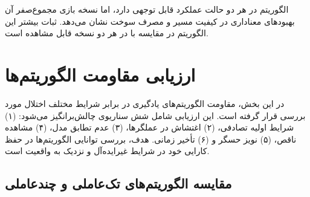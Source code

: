 الگوریتم  در هر دو حالت عملکرد قابل توجهی دارد، اما نسخه بازی مجموع‌صفر آن بهبودهای معناداری در کیفیت مسیر و مصرف سوخت نشان می‌دهد. ثبات بیشتر این الگوریتم در مقایسه با  در هر دو نسخه قابل مشاهده است.

\section{ارزیابی مقاومت الگوریتم‌ها}

در این بخش، مقاومت الگوریتم‌های یادگیری در برابر شرایط مختلف اختلال مورد بررسی قرار گرفته است. این ارزیابی شامل شش سناریوی چالش‌برانگیز می‌شود: (۱) شرایط اولیه تصادفی، (۲) اغتشاش در عملگرها، (۳) عدم تطابق مدل، (۴) مشاهده ناقص، (۵) نویز حسگر و (۶) تأخیر زمانی. هدف، بررسی توانایی الگوریتم‌ها در حفظ کارایی خود در شرایط غیرایده‌آل و نزدیک به واقعیت است.

\subsection{مقایسه الگوریتم‌های تک‌عاملی و چندعاملی }

